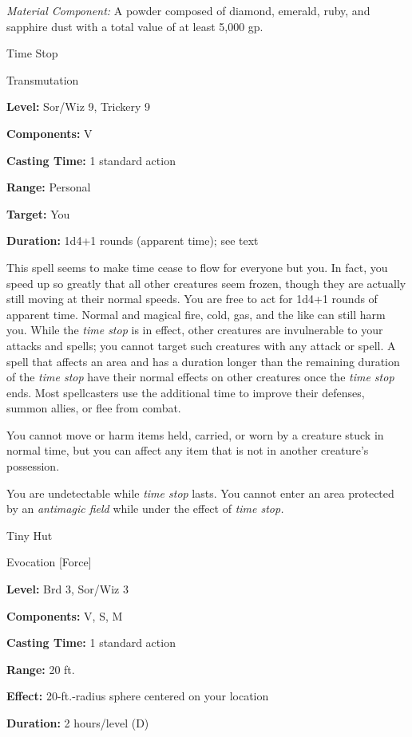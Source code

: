 \documentclass{article}
\begin{document}
\textit{Material Component: }A powder composed of diamond, emerald, ruby, and sapphire 
dust with a total value of at least 5,000 gp.

\vspace{12pt}
Time Stop

Transmutation

\textbf{Level:} Sor/Wiz 9, Trickery 9

\textbf{Components:} V

\textbf{Casting Time:} 1 standard action

\textbf{Range:} Personal

\textbf{Target:} You

\textbf{Duration:} 1d4+1 rounds (apparent time); see text

This spell seems to make time cease to flow for everyone but you. In fact, you 
speed up so greatly that all other creatures seem frozen, though they are actually 
still moving at their normal speeds. You are free to act for 1d4+1 rounds of apparent 
time. Normal and magical fire, cold, gas, and the like can still harm you. While 
the \textit{time stop }is in effect, other creatures are invulnerable to your attacks 
and spells; you cannot target such creatures with any attack or spell. A spell 
that affects an area and has a duration longer than the remaining duration of the 
\textit{time stop} have their normal effects on other creatures once the \textit{time 
stop }ends. Most spellcasters use the additional time to improve their defenses, 
summon allies, or flee from combat.

You cannot move or harm items held, carried, or worn by a creature stuck in normal 
time, but you can affect any item that is not in another creature's possession.

You are undetectable while \textit{time stop }lasts. You cannot enter an area protected 
by an \textit{antimagic field }while under the effect of \textit{time stop.}

\vspace{12pt}
Tiny Hut

Evocation [Force]

\textbf{Level:} Brd 3, Sor/Wiz 3

\textbf{Components:} V, S, M

\textbf{Casting Time:} 1 standard action

\textbf{Range:} 20 ft.

\textbf{Effect:} 20-ft.-radius sphere centered on your location

\textbf{Duration:} 2 hours/level (D)
\end{document}
